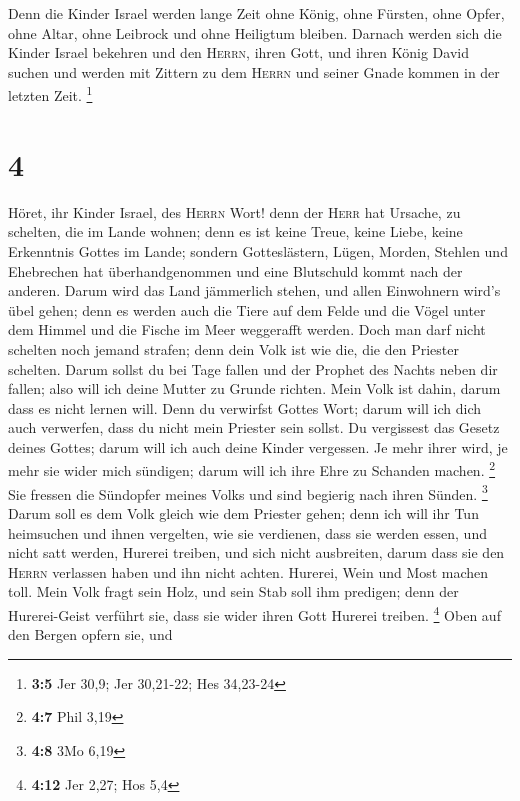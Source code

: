  Denn die Kinder Israel werden lange Zeit ohne König, ohne
Fürsten, ohne Opfer, ohne Altar, ohne Leibrock und ohne Heiligtum
bleiben.  Darnach werden sich die Kinder Israel bekehren
und den \textsc{Herrn}, ihren Gott, und ihren König David suchen und
werden mit Zittern zu dem \textsc{Herrn} und seiner Gnade kommen in der
letzten Zeit. \footnote{\textbf{3:5} Jer 30,9; Jer 30,21-22; Hes
  34,23-24}

\hypertarget{section-1}{%
\section{4}\label{section-1}}

 Höret, ihr Kinder Israel, des \textsc{Herrn} Wort! denn
der \textsc{Herr} hat Ursache, zu schelten, die im Lande wohnen; denn es
ist keine Treue, keine Liebe, keine Erkenntnis Gottes im Lande;
 sondern Gotteslästern, Lügen, Morden, Stehlen und
Ehebrechen hat überhandgenommen und eine Blutschuld kommt nach der
anderen.  Darum wird das Land jämmerlich stehen, und allen
Einwohnern wird's übel gehen; denn es werden auch die Tiere auf dem
Felde und die Vögel unter dem Himmel und die Fische im Meer weggerafft
werden.  Doch man darf nicht schelten noch jemand strafen;
denn dein Volk ist wie die, die den Priester schelten. 
Darum sollst du bei Tage fallen und der Prophet des Nachts neben dir
fallen; also will ich deine Mutter zu Grunde richten. 
Mein Volk ist dahin, darum dass es nicht lernen will. Denn du verwirfst
Gottes Wort; darum will ich dich auch verwerfen, dass du nicht mein
Priester sein sollst. Du vergissest das Gesetz deines Gottes; darum will
ich auch deine Kinder vergessen.  Je mehr ihrer wird, je
mehr sie wider mich sündigen; darum will ich ihre Ehre zu Schanden
machen. \footnote{\textbf{4:7} Phil 3,19}  Sie fressen die
Sündopfer meines Volks und sind begierig nach ihren Sünden. \footnote{\textbf{4:8}
  3Mo 6,19}  Darum soll es dem Volk gleich wie dem
Priester gehen; denn ich will ihr Tun heimsuchen und ihnen vergelten,
wie sie verdienen,  dass sie werden essen, und nicht satt
werden, Hurerei treiben, und sich nicht ausbreiten, darum dass sie den
\textsc{Herrn} verlassen haben und ihn nicht achten. 
Hurerei, Wein und Most machen toll.  Mein Volk fragt sein
Holz, und sein Stab soll ihm predigen; denn der Hurerei-Geist verführt
sie, dass sie wider ihren Gott Hurerei treiben. \footnote{\textbf{4:12}
  Jer 2,27; Hos 5,4}  Oben auf den Bergen opfern sie, und
